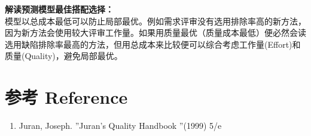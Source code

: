 \textbf{解读预测模型最佳搭配选择：}\\
模型以总成本最低可以防止局部最优。例如需求评审没有选用排除率高的新方法，因为新方法会使用较大评审工作量。如果用质量最优（质量成本最低）便必然会读选用缺陷排除率最高的方法，但用总成本来比较便可以综合考虑工作量(Effort)和质量(Quality)，避免局部最优。\\

\hypertarget{ux53c2ux8003-reference}{%
\section{参考 Reference}\label{ux53c2ux8003-reference}}

\begin{enumerate}
\tightlist
\item
  Juran, Joseph. ''Juran's Quality Handbook ''(1999) 5/e\\
\end{enumerate}



